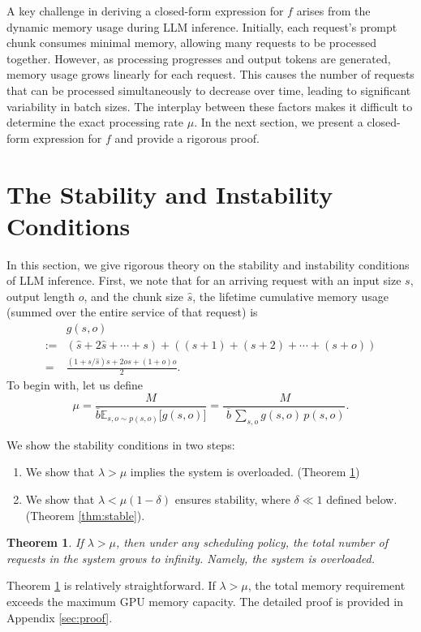 \documentclass{article}
\theoremstyle{plain}
\newtheorem{theorem}{Theorem}[section]
\theoremstyle{definition}
\theoremstyle{remark}
\begin{document}
A key challenge in deriving a closed-form expression for \( f \) arises from the dynamic memory usage during LLM inference. Initially, each request’s prompt chunk consumes minimal memory, allowing many requests to be processed together. However, as processing progresses and output tokens are generated, memory usage grows linearly for each request. This causes the number of requests that can be processed simultaneously to decrease over time, leading to significant variability in batch sizes. The interplay between these factors makes it difficult to determine the exact processing rate \( \mu \). In the next section, we present a closed-form expression for \( f \) and provide a rigorous proof.

\section{The Stability and Instability Conditions}

\label{sec: stability}
In this section, we give rigorous theory on the stability and instability conditions of LLM inference. First, we note that for an  arriving request with an input size \(s\), output length \(o\), and the chunk size \(\hat{s}\), the lifetime cumulative memory usage (summed over the entire service of that request) is
\begin{align*}
& g(s,o)\\
:=&(\hat{s}+2\hat{s}+\cdots+s)+((s+1)+(s+2)+\cdots+(s+o)) \\
= &\frac{(1+s/\hat{s})s+2os+(1+o)o}{2}.
\end{align*}
To begin with, let us
define 
\begin{equation} \label{eq:processing}
  \mu =\frac{M}{\bar{b} \mathbb{E}_{s,o\sim p(s,o)}\Big[g(s,o)\Big] }=
  \frac{\,M }{\;\overline{b}\,\sum_{s,o} g(s,o)\,p(s,o)}.
\end{equation}


We show the stability conditions in two steps: 
\begin{enumerate}
    \item 
We show that \(\lambda > \mu\) implies the system is overloaded. (Theorem \ref{thm:overload}) 
\item  We show that \(\lambda < \mu(1-\delta)\) ensures stability, where $\delta\ll 1$ defined below. (Theorem \ref{thm:stable}).
\end{enumerate}



\begin{theorem} \label{thm:overload}
    If $\lambda > \mu$, then under any scheduling policy, the total number of requests in the system grows to infinity. Namely, the system is overloaded.
\end{theorem}
Theorem \ref{thm:overload} is relatively straightforward. If $\lambda > \mu$, the total memory requirement exceeds the maximum GPU memory capacity. The detailed proof is provided in Appendix \ref{sec:proof}.
\end{document}
